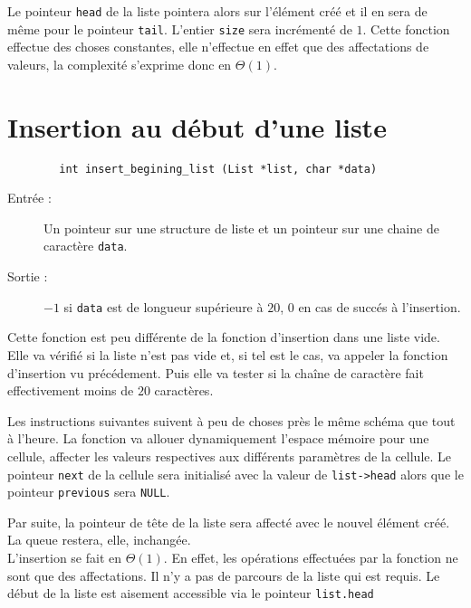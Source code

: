 \documentclass[a4paper, 12pt, leqno]{report}
\theoremstyle{plain}
\begin{document}
            Le pointeur \verb+head+ de la liste pointera alors sur l'élément créé et il en sera de même pour le pointeur \verb+tail+. L'entier \verb+size+ sera incrémenté de $1$. Cette fonction effectue des choses constantes, elle n'effectue en effet que des affectations de valeurs, la complexité s'exprime donc en $\Theta(1)$. 
             
            
    		\section{Insertion au début d'une liste}
           \begin{verbatim}
        int insert_begining_list (List *list, char *data)
           \end{verbatim}
            \begin{description}
            \item[Entrée :] Un pointeur sur une structure de liste et un pointeur sur une chaine de caractère \verb+data+.
            \item[Sortie :] $-1$ si \verb+data+ est de longueur supérieure à $20$, $0$ en cas de succés à l'insertion.
            \end{description}
            
            
            Cette fonction est peu différente de la fonction d'insertion dans une liste vide. Elle va vérifié si la liste n'est pas vide et, si tel est le cas, va appeler la fonction d'insertion vu précédement. Puis elle va tester si la chaîne de caractère fait effectivement moins de $20$ caractères. 
            
            Les instructions suivantes suivent à peu de choses près le même schéma que tout à l'heure. La fonction va allouer dynamiquement l'espace mémoire pour une cellule, affecter les valeurs respectives aux différents paramètres de la cellule. Le pointeur \verb+next+ de la cellule sera initialisé avec la valeur de \verb+list->head+ alors que le pointeur \verb+previous+ sera \verb+NULL+.
            
            Par suite, la pointeur de tête de la liste sera affecté avec le nouvel élément créé. La queue restera, elle, inchangée.\\
            
            L'insertion se fait en $\Theta(1)$. En effet, les opérations effectuées par la fonction ne sont que des affectations. Il n'y a pas de parcours de la liste qui est requis. Le début de la liste est aisement accessible via le pointeur \verb+list.head+
            
\end{document}
